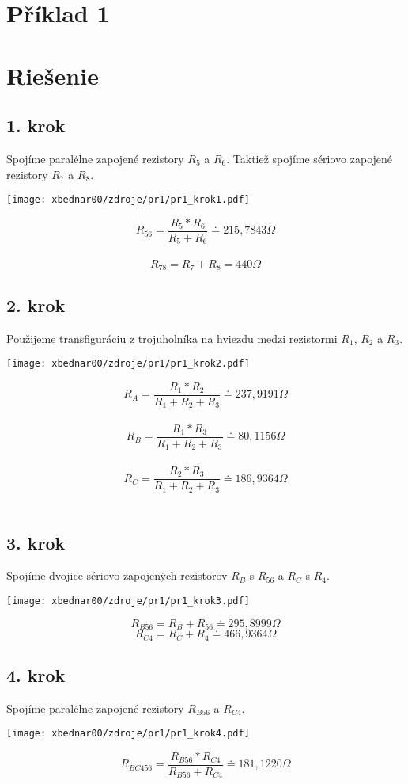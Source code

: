 \section{Příklad 1}

\section*{Riešenie}
\subsection*{1. krok}
Spojíme paralélne zapojené rezistory $R_5$ a $R_6$.
Taktiež spojíme sériovo zapojené rezistory $R_7$ a $R_8$.\\
\begin{center}
\texttt{[image: xbednar00/zdroje/pr1/pr1\_krok1.pdf]}
\end{center}

$$R_{56}=\frac{R_5*R_6}{R_5+R_6}\doteq215,7843\Omega$$\\
$$R_{78}=R_7+R_8=440\Omega$$

\newpage
\subsection*{2. krok}
Použijeme transfiguráciu z trojuholníka na hviezdu medzi rezistormi $R_1$, $R_2$ a $R_3$.
\begin{center}
\texttt{[image: xbednar00/zdroje/pr1/pr1\_krok2.pdf]}
\end{center}
$$R_A=\frac{R_1*R_2}{R_1+R_2+R_3}\doteq237,9191\Omega$$\\
$$R_B=\frac{R_1*R_3}{R_1+R_2+R_3}\doteq80,1156\Omega$$\\
$$R_C=\frac{R_2*R_3}{R_1+R_2+R_3}\doteq186,9364\Omega$$\\

\subsection*{3. krok}
Spojíme dvojice sériovo zapojených  rezistorov $R_B$ s $R_{56}$ a $R_C$ s $R_4$.
\begin{center}
\texttt{[image: xbednar00/zdroje/pr1/pr1\_krok3.pdf]}
\end{center}
$$R_{B56}=R_B+R_{56}\doteq295,8999\Omega$$
$$R_{C4}=R_C+R_4\doteq466,9364\Omega$$

\subsection*{4. krok}
Spojíme paralélne zapojené  rezistory $R_{B56}$ a $R_{C4}$.
\begin{center}
\texttt{[image: xbednar00/zdroje/pr1/pr1\_krok4.pdf]}
\end{center}
$$R_{BC456}=\frac{R_{B56}*R_{C4}}{R_{B56}+R_{C4}}\doteq181,1220\Omega$$\\

